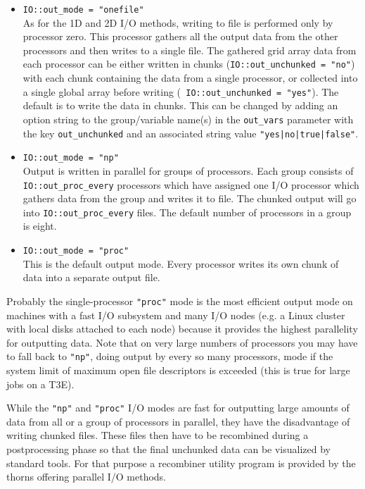 \documentclass{article}
\begin{document}
\begin{itemize}
  \item {\tt IO::out\_mode = "onefile"}\\
    As for the 1D and 2D I/O methods, writing to file is performed only
    by processor zero.
    This processor gathers all the output data from the other processors
    and then writes to a single file. The gathered grid array data from each
    processor can be either written in chunks ({\tt IO::out\_unchunked =
    "no"}) with each chunk containing the data from a single processor, or
    collected into a single global array before writing ({\tt
    IO::out\_unchunked = "yes"}). The default is to write the data in chunks.
    This can be changed by adding an option string to the group/variable name(s)
    in the {\tt out\_vars} parameter with the key {\tt out\_unchunked} and an
    associated string value {\tt "yes|no|true|false"}.

  \item {\tt IO::out\_mode = "np"}\\
    Output is written in parallel for groups of processors. Each group
    consists of {\tt IO::out\_proc\_every} processors which have assigned one I/O
    processor which gathers data from the group and writes it to file. The
    chunked output will go into {\tt IO::out\_proc\_every} files.
    The default number of processors in a group is eight.

  \item {\tt IO::out\_mode = "proc"}\\
    This is the default output mode.
    Every processor writes its own chunk of data into a separate output file.
\end{itemize}

Probably the single-processor {\tt "proc"} mode is the most efficient output
mode on machines with a fast I/O subsystem and many I/O nodes (e.g. a Linux
cluster with local disks attached to each node) because it provides the highest
parallelity for outputting data. Note that on very large numbers of processors
you may have to fall back to {\tt "np"}, doing output by every so many processors,
mode if the system limit of maximum open file descriptors is exceeded (this is
true for large jobs on a T3E).

While the {\tt "np"} and {\tt "proc"} I/O modes are fast for outputting large
amounts of data from all or a group of processors in parallel, they have
the disadvantage of writing chunked files. These files then have to be
recombined during a postprocessing phase so that the final unchunked data can be
visualized by standard tools. For that purpose a recombiner utility program is
provided by the thorns offering parallel I/O methods.
\end{document}
